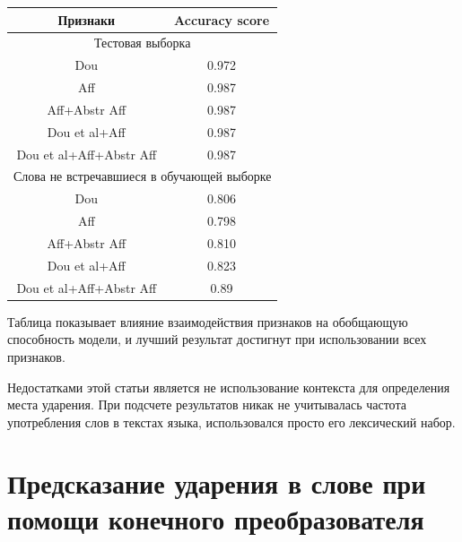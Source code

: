 \documentclass[14pt, a4paper, russian]{report}
\begin{document}
\begin{normalsize}
\begin{table}[H]
	\begin{small}
		\begin{center}
			\begin{tabular}{|c|c|}
				\hline
				       Признаки         &             Accuracy score             \\ \hline
				\multicolumn{2}{|c|}{Тестовая выборка}                           \\ \hline
				          Dou           &                 0.972                  \\ \hline
				          Aff           &                 0.987                  \\ \hline
				     Aff+Abstr Aff      &                 0.987                  \\ \hline
				     Dou et al+Aff      &                 0.987                  \\ \hline
				Dou et al+Aff+Abstr Aff &                 0.987                  \\ \hline
				\multicolumn{2}{|c|}{Слова не встречавшиеся в обучающей выборке} \\ \hline
				          Dou           &                 0.806                  \\ \hline
				          Aff           &                 0.798                  \\ \hline
				     Aff+Abstr Aff      &                 0.810                  \\ \hline
				     Dou et al+Aff      &                 0.823                  \\ \hline
				Dou et al+Aff+Abstr Aff &                  0.89                  \\ \hline
			\end{tabular}
		\end{center}
	\end{small}
	\label{table:range_res}
\end{table}

Таблица показывает  влияние взаимодействия признаков на обобщающую способность модели, и лучший результат достигнут при использовании всех признаков.

Недостатками этой статьи является не использование контекста для определения места ударения. При подсчете результатов никак не учитывалась частота употребления слов в текстах языка, использовался просто его лексический набор.

\section{Предсказание ударения в слове при помощи конечного преобразователя}


\end{normalsize}
\end{document}
